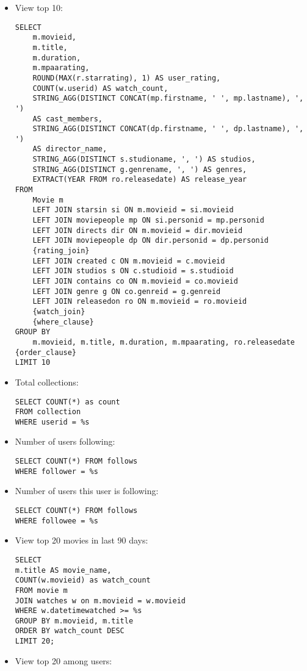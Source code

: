 \documentclass[12pt]{article}
\begin{document}
\begin{itemize}
    \item View top 10: \begin{verbatim}
SELECT 
    m.movieid,
    m.title,
    m.duration,
    m.mpaarating,
    ROUND(MAX(r.starrating), 1) AS user_rating,
    COUNT(w.userid) AS watch_count,
    STRING_AGG(DISTINCT CONCAT(mp.firstname, ' ', mp.lastname), ', ')
    AS cast_members,
    STRING_AGG(DISTINCT CONCAT(dp.firstname, ' ', dp.lastname), ', ')
    AS director_name,
    STRING_AGG(DISTINCT s.studioname, ', ') AS studios,
    STRING_AGG(DISTINCT g.genrename, ', ') AS genres,
    EXTRACT(YEAR FROM ro.releasedate) AS release_year
FROM
    Movie m
    LEFT JOIN starsin si ON m.movieid = si.movieid
    LEFT JOIN moviepeople mp ON si.personid = mp.personid
    LEFT JOIN directs dir ON m.movieid = dir.movieid
    LEFT JOIN moviepeople dp ON dir.personid = dp.personid
    {rating_join}
    LEFT JOIN created c ON m.movieid = c.movieid
    LEFT JOIN studios s ON c.studioid = s.studioid
    LEFT JOIN contains co ON m.movieid = co.movieid
    LEFT JOIN genre g ON co.genreid = g.genreid
    LEFT JOIN releasedon ro ON m.movieid = ro.movieid
    {watch_join}
    {where_clause}
GROUP BY
    m.movieid, m.title, m.duration, m.mpaarating, ro.releasedate
{order_clause}
LIMIT 10
\end{verbatim}
    \item Total collections: \begin{verbatim}
SELECT COUNT(*) as count 
FROM collection
WHERE userid = %s
\end{verbatim}
    \item Number of users following: \begin{verbatim}
SELECT COUNT(*) FROM follows
WHERE follower = %s 
\end{verbatim}
    \item Number of users this user is following: \begin{verbatim}
SELECT COUNT(*) FROM follows
WHERE followee = %s 
\end{verbatim}
    \item View top 20 movies in last 90 days: \begin{verbatim}
SELECT 
m.title AS movie_name,
COUNT(w.movieid) as watch_count
FROM movie m
JOIN watches w on m.movieid = w.movieid
WHERE w.datetimewatched >= %s
GROUP BY m.movieid, m.title
ORDER BY watch_count DESC
LIMIT 20;
\end{verbatim} 
    \item View top 20 among users: \begin{verbatim}

\end{verbatim}
\end{itemize}
\end{document}
